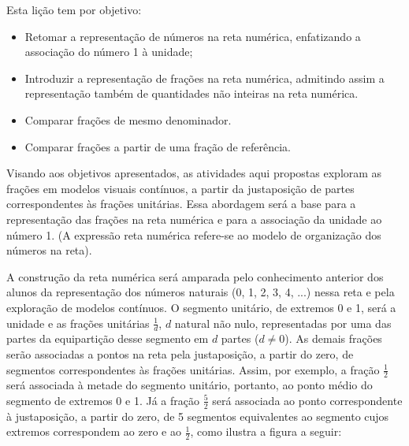 

\noindent {\color{special}{\Large \bf Para o professor}}
\vspace{.5cm}

Esta lição tem por objetivo: 
\begin{itemize}
 \item Retomar a representação de números na reta numérica, enfatizando a associação do número 1 à unidade;
 \item Introduzir a representação de frações na reta numérica, admitindo assim a representação também de quantidades não inteiras na reta numérica.
 \item Comparar frações de mesmo denominador.
 \item Comparar frações a partir de uma fração de referência.
\end{itemize}

Visando aos objetivos apresentados, as atividades aqui propostas exploram as frações em modelos visuais contínuos, a partir da justaposição de partes correspondentes às frações unitárias. Essa abordagem será a base para a representação das frações na reta numérica e para a associação da unidade ao número 1.  (A expressão reta numérica refere-se ao modelo de organização dos números na reta). 

A construção da reta numérica será amparada pelo conhecimento anterior dos alunos da representação dos números naturais (0, 1, 2, 3, 4, ...) nessa reta e pela exploração de modelos contínuos. O segmento unitário, de extremos 0 e 1, será a unidade e as frações unitárias $\frac{1}{d}$, $d$ natural não nulo, representadas por uma das partes da equipartição desse segmento em $d$ partes ($d\neq0$). As demais frações serão associadas a pontos na reta pela justaposição, a partir do zero, de segmentos correspondentes às frações unitárias. Assim, por exemplo, a fração $\frac{1}{2}$ será associada à metade do segmento unitário, portanto, ao ponto médio do segmento de extremos 0 e 1. Já a fração $\frac{5}{2}$ será associada ao ponto correspondente à justaposição, a partir do zero, de 5 segmentos equivalentes ao segmento cujos extremos correspondem ao zero e ao $\frac{1}{2}$, como ilustra a figura a seguir:

